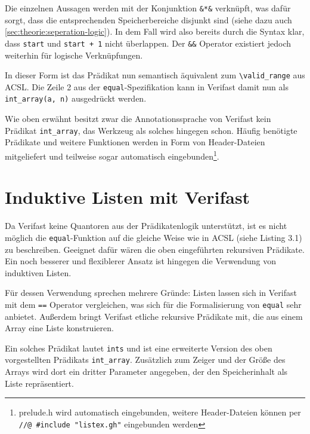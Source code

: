 Die einzelnen Aussagen werden mit der Konjunktion \lstinline{&*&} verknüpft, was dafür sorgt, dass die entsprechenden
Speicherbereiche disjunkt sind (siehe dazu auch \ref{sec:theorie:seperation-logic}). In dem Fall wird also bereits
durch die Syntax klar, dass \lstinline{start} und \lstinline{start + 1} nicht überlappen. Der \lstinline{&&} Operator 
existiert jedoch weiterhin für logische Verknüpfungen.

In dieser Form ist das Prädikat nun semantisch äquivalent zum \lstinline{\valid_range} aus ACSL. Die Zeile 2 aus
der \texttt{equal}-Spezifikation kann in Verifast damit nun als \lstinline{int_array(a, n)} ausgedrückt werden.

Wie oben erwähnt besitzt zwar die Annotationssprache von Verifast kein Prädikat \lstinline{int_array}, das Werkzeug
als solches hingegen schon. Häufig benötigte Prädikate und weitere Funktionen werden in Form von Header-Dateien
mitgeliefert und teilweise sogar automatisch eingebunden\footnote{prelude.h wird automatisch eingebunden, weitere 
Header-Dateien können per \\ \lstinline{//@ #include "listex.gh"} eingebunden werden}.


\section{Induktive Listen mit Verifast}
\label{sec:induktive-listen}

Da Verifast keine Quantoren aus der Prädikatenlogik unterstützt, ist es nicht möglich die \texttt{equal}-Funktion
auf die gleiche Weise wie in ACSL (siehe Listing 3.1) zu beschreiben. Geeignet dafür wären die oben eingeführten
rekursiven Prädikate. Ein noch besserer und flexiblerer Ansatz ist hingegen die Verwendung von induktiven Listen.

Für dessen Verwendung sprechen mehrere Gründe: Listen lassen sich in Verifast mit dem \lstinline{==} Operator vergleichen,
was sich für die Formalisierung von \texttt{equal} sehr anbietet. Außerdem bringt Verifast etliche rekursive Prädikate
mit, die aus einem Array eine Liste konstruieren.



Ein solches Prädikat lautet \lstinline{ints} und ist eine erweiterte Version des oben vorgestellten Prädikats
\lstinline{int_array}. Zusätzlich zum Zeiger und der Größe des Arrays wird dort ein dritter Parameter angegeben, der
den Speicherinhalt als Liste repräsentiert. 

